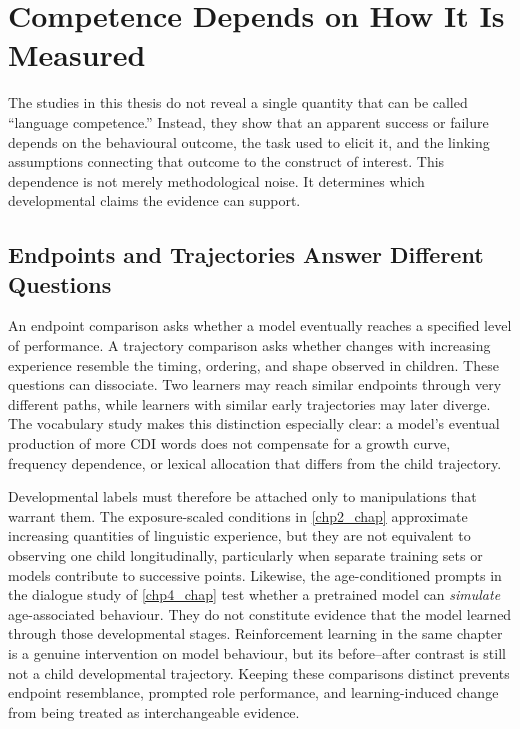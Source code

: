 \section{Competence Depends on How It Is Measured}
\label{sec:gd_measurement}

The studies in this thesis do not reveal a single quantity that can be called ``language competence.'' Instead, they show that an apparent success or failure depends on the behavioural outcome, the task used to elicit it, and the linking assumptions connecting that outcome to the construct of interest. This dependence is not merely methodological noise. It determines which developmental claims the evidence can support.

\subsection{Endpoints and Trajectories Answer Different Questions}

An endpoint comparison asks whether a model eventually reaches a specified level of performance. A trajectory comparison asks whether changes with increasing experience resemble the timing, ordering, and shape observed in children. These questions can dissociate. Two learners may reach similar endpoints through very different paths, while learners with similar early trajectories may later diverge. The vocabulary study makes this distinction especially clear: a model's eventual production of more CDI words does not compensate for a growth curve, frequency dependence, or lexical allocation that differs from the child trajectory.

Developmental labels must therefore be attached only to manipulations that warrant them. The exposure-scaled conditions in \cref{chp2_chap} approximate increasing quantities of linguistic experience, but they are not equivalent to observing one child longitudinally, particularly when separate training sets or models contribute to successive points. Likewise, the age-conditioned prompts in the dialogue study of \cref{chp4_chap} test whether a pretrained model can \emph{simulate} age-associated behaviour. They do not constitute evidence that the model learned through those developmental stages. Reinforcement learning in the same chapter is a genuine intervention on model behaviour, but its before--after contrast is still not a child developmental trajectory. Keeping these comparisons distinct prevents endpoint resemblance, prompted role performance, and learning-induced change from being treated as interchangeable evidence.

